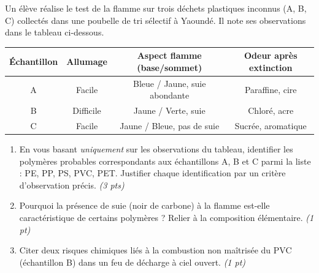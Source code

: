 \documentclass[11pt]{article}
\begin{document}
\begin{exercice}
Un élève réalise le test de la flamme sur trois déchets plastiques inconnus (A, B, C) collectés dans une poubelle de tri sélectif à Yaoundé. Il note ses observations dans le tableau ci-dessous.

\begin{tabular}{|c|c|c|c|}
\hline
\textbf{Échantillon} & \textbf{Allumage} & \textbf{Aspect flamme (base/sommet)} & \textbf{Odeur après extinction} \\ \hline
A & Facile & Bleue / Jaune, suie abondante & Paraffine, cire \\ \hline
B & Difficile & Jaune / Verte, suie & Chloré, acre \\ \hline
C & Facile & Jaune / Bleue, pas de suie & Sucrée, aromatique \\ \hline
\end{tabular}

\begin{enumerate}
    \item En vous basant \textit{uniquement} sur les observations du tableau, identifier les polymères probables correspondants aux échantillons A, B et C parmi la liste : PE, PP, PS, PVC, PET. Justifier chaque identification par un critère d'observation précis. \textit{(3 pts)}
    \item Pourquoi la présence de suie (noir de carbone) à la flamme est-elle caractéristique de certains polymères ? Relier à la composition élémentaire. \textit{(1 pt)}
    \item Citer deux risques chimiques liés à la combustion non maîtrisée du PVC (échantillon B) dans un feu de décharge à ciel ouvert. \textit{(1 pt)}
\end{enumerate}
\end{exercice}
\end{document}
